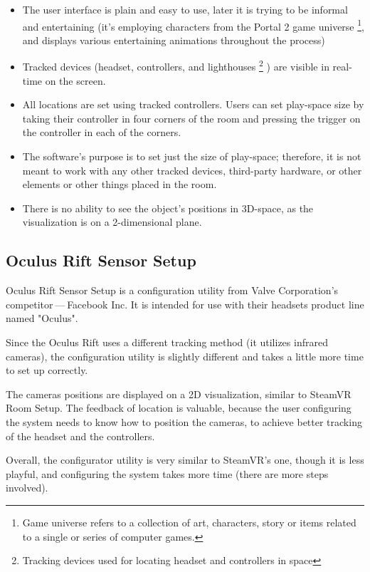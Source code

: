 \begin{itemize}
\item The user interface is plain and easy to use, later it is trying to be informal
and entertaining (it’s employing characters from the Portal 2 game universe
\footnote{Game universe refers to a collection of art, characters, story or items related to a single or series of computer games.},
and displays various entertaining animations throughout the process)
\item Tracked devices (headset, controllers, and lighthouses
\footnote{Tracking devices used for locating headset and controllers in space}
) are visible in
real-time on the screen.
\item All locations are set using tracked controllers. Users can set play-space
size by taking their controller in four corners of the room and pressing
the trigger on the controller in each of the corners.
\item The software’s purpose is to set just the size of play-space; therefore, it is not
meant to work with any other tracked devices, third-party hardware, or other elements or
other things placed in the room.
\item There is no ability to see the object’s positions in 3D-space, as the visualization is
on a 2-dimensional plane.
\end{itemize}

\hypertarget{x-oculus-rift-sensor-setup}{\subsection{Oculus Rift Sensor Setup}}
Oculus Rift Sensor Setup is a configuration utility from Valve Corporation’s
competitor — Facebook Inc. It is intended for use with their headsets
product line named "Oculus".

Since the Oculus Rift uses a different tracking method (it utilizes infrared cameras),
the configuration utility is slightly different and takes a little more
time to set up correctly.

The cameras positions are displayed on a 2D visualization, similar
to SteamVR Room Setup. The feedback of location is valuable, because the
user configuring the system needs to know how to position the
cameras, to achieve better tracking of the headset and the controllers.

Overall, the configurator utility is very similar to SteamVR’s one, though it
is less playful, and configuring the system takes more time (there are more steps
involved).


